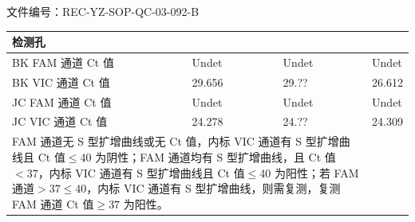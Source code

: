 \documentclass[UTF8,10pt,a4paper,fontset=fandol]{ctexart}
\newcommand{\fieldvalue}[1]{#1}
\newcommand{\handwritten}[1]{#1}
\begin{document}
\noindent
文件编号：REC-YZ-SOP-QC-03-092-B

\begin{center}
\begin{tabular}{|p{3.0cm}|p{3.0cm}|p{3.0cm}|p{3.0cm}|}
\hline
\centering 检测孔 & \centering 1 & \centering 2 & \centering 3\\
\hline
BK FAM 通道 Ct 值 &
\fieldvalue{\handwritten{Undet}} &
\fieldvalue{\handwritten{Undet}} &
\fieldvalue{\handwritten{Undet}}\\
\hline
BK VIC 通道 Ct 值 &
\fieldvalue{\handwritten{29.656}} &
\fieldvalue{\handwritten{29.??}} &
\fieldvalue{\handwritten{26.612}}\\
\hline
JC FAM 通道 Ct 值 &
\fieldvalue{\handwritten{Undet}} &
\fieldvalue{\handwritten{Undet}} &
\fieldvalue{\handwritten{Undet}}\\
\hline
JC VIC 通道 Ct 值 &
\fieldvalue{\handwritten{24.278}} &
\fieldvalue{\handwritten{24.??}} &
\fieldvalue{\handwritten{24.309}}\\
\hline
\multicolumn{3}{|p{9.0cm}|}{
FAM 通道无 S 型扩增曲线或无 Ct 值，内标 VIC 通道有 S 型扩增曲线且 Ct 值$\leq$40 为阴性；FAM 通道均有 S 型扩增曲线，且 Ct 值$<37$，内标 VIC 通道有 S 型扩增曲线且 Ct 值$\leq$40 为阳性；若 FAM 通道$>37\leq40$，内标 VIC 通道有 S 型扩增曲线，则需复测，复测 FAM 通道 Ct 值$\geq37$ 为阳性。
}
\end{tabular}
\end{center}
\end{document}
